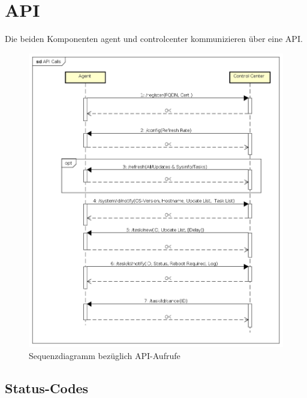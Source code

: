 \section{API}

Die beiden Komponenten \gls{agent} und \gls{controlcenter} kommunizieren über eine API.

\begin{figure}
  \centering
    \includegraphics[width=\textwidth]{fig/API_Calls}
  \caption{Sequenzdiagramm bezüglich API-Aufrufe}
  \label{fig:api_sequence_diagram}
\end{figure}

\subsection{Status-Codes}

